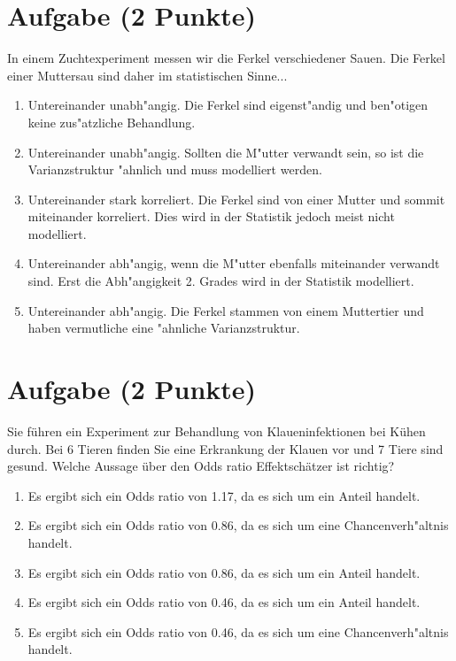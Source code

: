 \documentclass[a4paper, 9pt]{scrartcl}\usepackage[]{graphicx}\usepackage[]{xcolor}
\begin{document}
\section{Aufgabe \hfill (2 Punkte)}

In einem Zuchtexperiment messen wir die Ferkel verschiedener Sauen. Die
Ferkel einer Muttersau sind daher im statistischen Sinne... 



\begin{enumerate}
\item [\textbf{A} \msquare] Untereinander unabh{"a}ngig. Die Ferkel sind eigenst{"a}ndig und ben{"o}tigen keine zus{"a}tzliche Behandlung.
\item [\textbf{B} \msquare] Untereinander unabh{"a}ngig. Sollten die M{"u}tter verwandt sein, so ist die Varianzstruktur {"a}hnlich und muss modelliert werden.
\item [\textbf{C} \msquare] Untereinander stark korreliert. Die Ferkel sind von einer Mutter und sommit miteinander korreliert. Dies wird in der Statistik jedoch meist nicht modelliert.
\item [\textbf{D} \msquare] Untereinander abh{"a}ngig, wenn die M{"u}tter ebenfalls miteinander verwandt sind. Erst die Abh{"a}ngigkeit 2. Grades wird in der Statistik modelliert.
\item [\textbf{E} \msquare] Untereinander abh{"a}ngig. Die Ferkel stammen von einem Muttertier und haben vermutliche eine {"a}hnliche Varianzstruktur.
\end{enumerate}

\section{Aufgabe \hfill (2 Punkte)}



Sie f{\"u}hren ein Experiment zur Behandlung von Klaueninfektionen bei K{\"u}hen
durch. Bei 6 Tieren finden Sie eine Erkrankung der Klauen vor und
7 Tiere sind gesund. Welche Aussage {\"u}ber den Odds ratio
Effektsch{\"a}tzer ist richtig?



\begin{enumerate}
\item [\textbf{A} \msquare] Es ergibt sich ein Odds ratio von 1.17, da es sich um ein Anteil handelt.
\item [\textbf{B} \msquare] Es ergibt sich ein Odds ratio von 0.86, da es sich um eine Chancenverh{"a}ltnis handelt.
\item [\textbf{C} \msquare] Es ergibt sich ein Odds ratio von 0.86, da es sich um ein Anteil handelt.
\item [\textbf{D} \msquare] Es ergibt sich ein Odds ratio von 0.46, da es sich um ein Anteil handelt.
\item [\textbf{E} \msquare] Es ergibt sich ein Odds ratio von 0.46, da es sich um eine Chancenverh{"a}ltnis handelt.
\end{enumerate}
\end{document}
